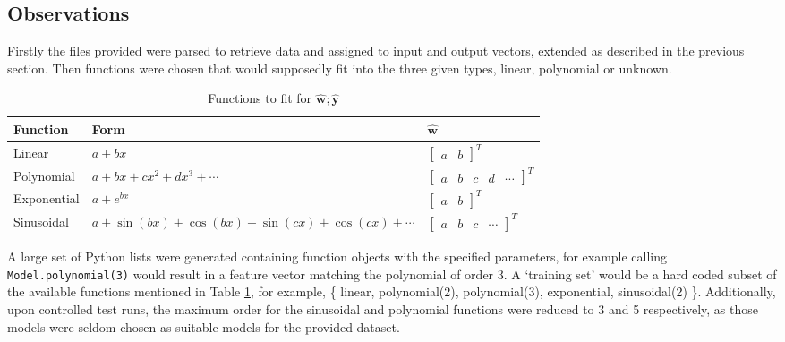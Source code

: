 \documentclass{article}
\newcommand*{\vc}[1]{\ensuremath{\boldsymbol{{#1}}}}
\newcommand*{\qt}[1]{`#1'}
\newcommand{\vvc}[1]{\begin{bmatrix}#1\end{bmatrix}}
\begin{document}
\subsection{Observations}

Firstly the files provided were parsed to retrieve data and assigned to input and output vectors, extended as described in the previous section. Then functions were chosen that would supposedly fit into the three given types, linear, polynomial or unknown.

\begin{table}[h!]
  \begin{center}
    \begin{tabular}{
        | m{5em} | m{20em} | m{10em} |
      }
      \hline
      Function    & Form                                                    & $\vc {\hat w}$                                       \\
      \hline\hline
      Linear      & $a+bx$                                                  & $\vvc{a        & b}^T$                               \\ \hline
      Polynomial  & $a+bx+cx^2+dx^3+\cdots$                                 & $\vvc{a        & b     & c & d          & \cdots}^T$ \\ \hline
      Exponential & $a+e^{bx}$                                              & $\vvc{a        & b}^T$                               \\ \hline
      Sinusoidal  & $a + \sin(bx) + \cos(bx) + \sin(cx) + \cos(cx)+\cdots $ & $\vvc{a        & b     & c & \cdots}^T$              \\ \hline
    \end{tabular}
  \end{center}
  \caption{Functions to fit for $\vc {\hat w}; \vc{\hat y}$}
  \label{tab:fnclasses}
\end{table}

A large set of Python lists were generated containing function objects with the specified parameters, for example calling \texttt{Model.\-polynomial(3)} would result in a feature vector matching the polynomial of order 3. A \qt{training set} would be a hard coded subset of the available functions mentioned in Table \ref{tab:fnclasses}, for example, \{ linear, polynomial(2), polynomial(3), exponential, sinusoidal(2) \}. Additionally, upon controlled test runs, the maximum order for the sinusoidal and polynomial functions were reduced to 3 and 5 respectively, as those models were seldom chosen as suitable models for the provided dataset.
\end{document}
